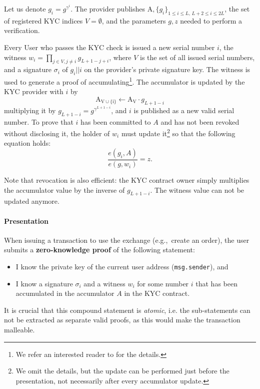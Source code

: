 Let us denote $g_i = g^{\gamma^i}$.
The provider publishes
$\mathrm{A},\{g_i\}_{1\leq i\leq L, \,L+2\leq i \leq 2L}$, the set of registered KYC indices $V=\emptyset$, and the parameters $g,z$ needed 
to perform a verification.

Every User who passes the KYC check is issued a new serial number $i$, the witness $w_i = \prod_{j\in V,j\neq i} g_{L+1-j+i}$, where $V$ is the set of all issued serial numbers, and a signature $\sigma_i$ of $g_i||i$ on the provider's private signature key.
The witness is used to generate a proof of accumulating\footnote{We refer an interested reader to \cite{Camenisch2009} for the details.}.
The accumulator is updated by the KYC provider with $i$ by 
$$
\mathrm{A_{V\cup\{i\}}} \leftarrow \mathrm{A_V} \cdot g_{L+1-i}
$$multiplying it by $g_{L+1-i} = g^{\gamma^{L+1-i}}$, and $i$ is published as a new valid serial number.
To prove that $i$ has been committed to $A$ and has not been revoked without disclosing it, the holder of $w_i$ must update it\footnote{We omit the details, but the update can be performed just before the presentation, not necessarily after every accumulator update.} so that the 
following equation holds:
$$
\frac{e(g_i, A)}{e(g,w_i)} = z.
$$

Note that revocation is also efficient: the KYC contract owner simply multiplies the accumulator value by the inverse of $g_{L+1-i}$. The witness value can not be updated anymore.

\paragraph{Presentation} 
When issuing a transaction to use the exchange (e.g.,~create an order), the user submits a \textbf{zero-knowledge proof} of the following statement:
\begin{itemize}
	\item I know the private key of the current user address (\texttt{msg.sender}), and
	\item I know a signature $\sigma_i$ and a witness $w_i$ for some number $i$ that has been accumulated in the
	accumulator $A$ in the KYC contract.
\end{itemize}
It is crucial that this compound statement is \emph{atomic}, i.e. the sub-statements can not be extracted
as separate valid proofs, as this would make the transaction malleable.

